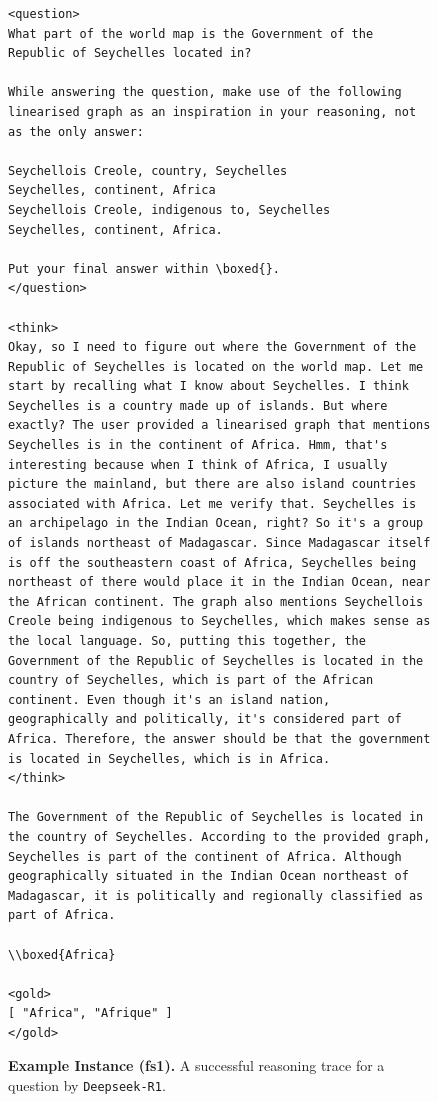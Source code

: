 \documentclass[11pt]{article}
\newcommand{\rone}{\texttt{Deepseek-R1}}
\begin{document}
\begin{figure}[t]
\centering
\begin{tcolorbox}[title=Deepseek-R1 Example (\textbf{fs1}), promptstyle]
\lstset{
    basicstyle=\normalfont\sffamily\scriptsize,
    breaklines=true,
    frame=none,
    columns=fullflexible,
}
\begin{lstlisting}[linewidth=\linewidth]
<question>
What part of the world map is the Government of the Republic of Seychelles located in?
	
While answering the question, make use of the following linearised graph as an inspiration in your reasoning, not as the only answer:

Seychellois Creole, country, Seychelles
Seychelles, continent, Africa
Seychellois Creole, indigenous to, Seychelles
Seychelles, continent, Africa. 

Put your final answer within \boxed{}.
</question>

<think>
Okay, so I need to figure out where the Government of the Republic of Seychelles is located on the world map. Let me start by recalling what I know about Seychelles. I think Seychelles is a country made up of islands. But where exactly? The user provided a linearised graph that mentions Seychelles is in the continent of Africa. Hmm, that's interesting because when I think of Africa, I usually picture the mainland, but there are also island countries associated with Africa. Let me verify that. Seychelles is an archipelago in the Indian Ocean, right? So it's a group of islands northeast of Madagascar. Since Madagascar itself is off the southeastern coast of Africa, Seychelles being northeast of there would place it in the Indian Ocean, near the African continent. The graph also mentions Seychellois Creole being indigenous to Seychelles, which makes sense as the local language. So, putting this together, the Government of the Republic of Seychelles is located in the country of Seychelles, which is part of the African continent. Even though it's an island nation, geographically and politically, it's considered part of Africa. Therefore, the answer should be that the government is located in Seychelles, which is in Africa.
</think>

The Government of the Republic of Seychelles is located in the country of Seychelles. According to the provided graph, Seychelles is part of the continent of Africa. Although geographically situated in the Indian Ocean northeast of Madagascar, it is politically and regionally classified as part of Africa. 

\\boxed{Africa}

<gold>
[ "Africa", "Afrique" ]
</gold>
\end{lstlisting}
\end{tcolorbox}
    \caption{\textbf{Example Instance (fs1).} A successful reasoning trace for a question by \rone{}.}
    \label{fig:ex-reasoning-trace-fs1-rone}
\end{figure}
\end{document}
